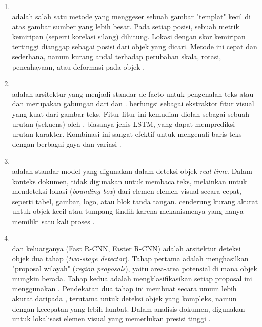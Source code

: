 \begin{enumerate}
    \item \templatematching{} ~\\ \templatematching{} adalah salah satu metode \cv yang menggeser sebuah gambar "templat" kecil di atas gambar sumber yang lebih besar. Pada setiap posisi, sebuah metrik kemiripan (seperti korelasi silang) dihitung. Lokasi dengan skor kemiripan tertinggi dianggap sebagai posisi dari objek yang dicari. Metode ini cepat dan sederhana, namun kurang andal terhadap perubahan skala, rotasi, pencahayaan, atau deformasi pada objek \parencite{bradski2008learning}.

    \item \crnn ~\\ 
    \crnn{} adalah arsitektur \dl{} yang menjadi standar de facto untuk pengenalan teks atau \ocr{} dan merupakan gabungan dari \cnn{} dan \rnn. \cnn{} berfungsi sebagai ekstraktor fitur visual yang kuat dari gambar teks. Fitur-fitur ini kemudian diolah sebagai sebuah urutan (sekuens) oleh \rnn, biasanya jenis LSTM, yang dapat memprediksi urutan karakter. Kombinasi ini sangat efektif untuk mengenali baris teks dengan berbagai gaya dan variasi \parencite{shi2016end}.

    \item \yolo ~\\ \yolo{} adalah standar model yang digunakan dalam deteksi objek \textit{real-time}. Dalam konteks dokumen, \yolo{} tidak digunakan untuk membaca teks, melainkan untuk mendeteksi lokasi (\emph{bounding box}) dari elemen-elemen visual secara cepat, seperti tabel, gambar, logo, atau blok tanda tangan. \yolo{} cenderung kurang akurat untuk objek kecil atau tumpang tindih karena mekanismenya yang hanya memiliki satu kali proses \parencite{diwan2023object}. 
    
    \item \rcnn{} ~\\ \rcnn{} dan keluarganya (Fast R-CNN, Faster R-CNN) adalah arsitektur deteksi objek dua tahap (\textit{two-stage detector}). Tahap pertama adalah menghasilkan "proposal wilayah" (\textit{region proposals}), yaitu area-area potensial di mana objek mungkin berada. Tahap kedua adalah mengklasifikasikan setiap proposal ini menggunakan \cnn. Pendekatan dua tahap ini membuat \rcnn{} secara umum lebih akurat daripada \yolo, terutama untuk deteksi objek yang kompleks, namun dengan kecepatan yang lebih lambat. Dalam analisis dokumen, \rcnn{} digunakan untuk lokalisasi elemen visual yang memerlukan presisi tinggi \parencite{xie2021oriented}.
\end{enumerate}

